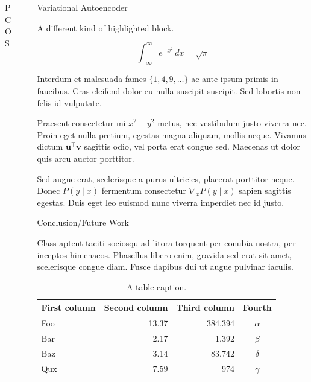 \documentclass[final]{beamer}
\newlength{\sepwidth}
\newlength{\colwidth}
\newcommand{\separatorcolumn}{\begin{column}{\sepwidth}\end{column}}
\begin{document}
\begin{frame}[t]
\begin{columns}[t]
\begin{column}{\colwidth}
\begin{block}{PCOS}
  \end{block}

\end{column}

\separatorcolumn

\begin{column}{\colwidth}

  \begin{exampleblock}{Variational Autoencoder}

    A different kind of highlighted block.

    $$
    \int_{-\infty}^{\infty} e^{-x^2}\,dx = \sqrt{\pi}
    $$

    Interdum et malesuada fames $\{1, 4, 9, \ldots\}$ ac ante ipsum primis in
    faucibus. Cras eleifend dolor eu nulla suscipit suscipit. Sed lobortis non
    felis id vulputate.


    Praesent consectetur mi $x^2 + y^2$ metus, nec vestibulum justo viverra
    nec. Proin eget nulla pretium, egestas magna aliquam, mollis neque. Vivamus
    dictum $\mathbf{u}^\intercal\mathbf{v}$ sagittis odio, vel porta erat
    congue sed. Maecenas ut dolor quis arcu auctor porttitor.


    Sed augue erat, scelerisque a purus ultricies, placerat porttitor neque.
    Donec $P(y \mid x)$ fermentum consectetur $\nabla_x P(y \mid x)$ sapien
    sagittis egestas. Duis eget leo euismod nunc viverra imperdiet nec id
    justo.

  \end{exampleblock}

  \begin{block}{Conclusion/Future Work}

    Class aptent taciti sociosqu ad litora torquent per conubia nostra, per
    inceptos himenaeos. Phasellus libero enim, gravida sed erat sit amet,
    scelerisque congue diam. Fusce dapibus dui ut augue pulvinar iaculis.

    \begin{table}
      \centering
      \begin{tabular}{l r r c}
        \toprule
        \textbf{First column} & \textbf{Second column} & \textbf{Third column} & \textbf{Fourth} \\
        \midrule
        Foo & 13.37 & 384,394 & $\alpha$ \\
        Bar & 2.17 & 1,392 & $\beta$ \\
        Baz & 3.14 & 83,742 & $\delta$ \\
        Qux & 7.59 & 974 & $\gamma$ \\
        \bottomrule
      \end{tabular}
      \caption{A table caption.}
    \end{table}


\end{block}
\end{column}
\end{columns}
\end{frame}
\end{document}
